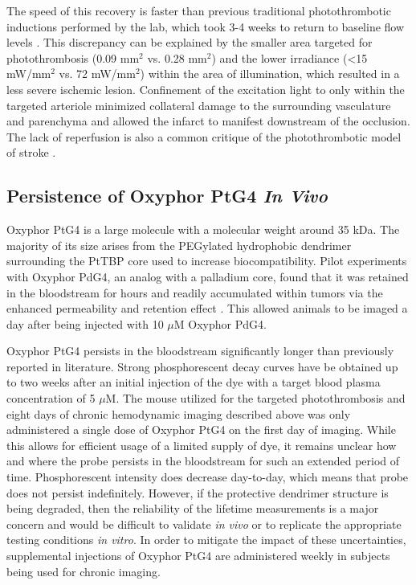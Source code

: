 The speed of this recovery is faster than previous traditional photothrombotic inductions performed by the lab, which took 3-4 weeks to return to baseline flow levels \cite{Schrandt:2015gu}. This discrepancy can be explained by the smaller area targeted for photothrombosis (0.09 mm$^2$ vs. 0.28 mm$^2$) and the lower irradiance (\textless15 mW/mm$^2$ vs. 72 mW/mm$^2$) within the area of illumination, which resulted in a less severe ischemic lesion. Confinement of the excitation light to only within the targeted arteriole minimized collateral damage to the surrounding vasculature and parenchyma and allowed the infarct to manifest downstream of the occlusion. The lack of reperfusion is also a common critique of the photothrombotic model of stroke \cite{Carmichael:2005gk}.

\subsection{Persistence of Oxyphor PtG4 \textit{In Vivo}}

Oxyphor PtG4 is a large molecule with a molecular weight around 35 kDa. The majority of its size arises from the PEGylated hydrophobic dendrimer surrounding the PtTBP core used to increase biocompatibility. Pilot experiments with Oxyphor PdG4, an analog with a palladium core, found that it was retained in the bloodstream for hours and readily accumulated within tumors via the enhanced permeability and retention effect \cite{Esipova:2011hi}. This allowed animals to be imaged a day after being injected with 10 $\mu$M Oxyphor PdG4.

Oxyphor PtG4 persists in the bloodstream significantly longer than previously reported in literature. Strong phosphorescent decay curves have be obtained up to two weeks after an initial injection of the dye with a target blood plasma concentration of 5 $\mu$M. The mouse utilized for the targeted photothrombosis and eight days of chronic hemodynamic imaging described above was only administered a single dose of Oxyphor PtG4 on the first day of imaging. While this allows for efficient usage of a limited supply of dye, it remains unclear how and where the probe persists in the bloodstream for such an extended period of time. Phosphorescent intensity does decrease day-to-day, which means that probe does not persist indefinitely. However, if the protective dendrimer structure is being degraded, then the reliability of the lifetime measurements is a major concern and would be difficult to validate \textit{in vivo} or to replicate the appropriate testing conditions \textit{in vitro}. In order to mitigate the impact of these uncertainties, supplemental injections of Oxyphor PtG4 are administered weekly in subjects being used for chronic imaging.



